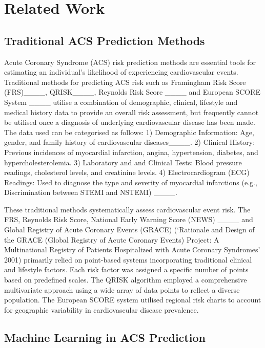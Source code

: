 \section{Related Work}
\subsection{Traditional ACS Prediction Methods}

Acute Coronary Syndrome (ACS) risk prediction methods are essential tools for estimating an individual's likelihood of experiencing cardiovascular events. Traditional methods for predicting ACS risk such as Framingham Risk Score (FRS)____, QRISK____, Reynolds Risk Score ____ and European SCORE System ____ utilise a combination of demographic, clinical, lifestyle and medical history data to provide an overall risk assessment, but frequently cannot be utilised once a diagnosis of underlying cardiovascular disease has been made. The data used can be categorised as follows: 1) Demographic Information: Age, gender, and family history of cardiovascular diseases____. 2) Clinical History: Previous incidences of myocardial infarction, angina, hypertension, diabetes, and hypercholesterolemia. 3) Laboratory and and Clinical Tests: Blood pressure readings, cholesterol levels, and creatinine levels. 4) Electrocardiogram (ECG) Readings: Used to diagnose the type and severity of myocardial infarctions (e.g., Discrimination between STEMI and NSTEMI) ____.

These traditional methods systematically assess cardiovascular event risk. The FRS, Reynolds Risk Score, National Early Warning Score (NEWS) ____  and Global Registry of Acute Coronary Events (GRACE) (‘Rationale and Design of the GRACE (Global Registry of Acute Coronary Events) Project: A Multinational Registry of Patients Hospitalized with Acute Coronary Syndromes’ 2001) primarily relied on point-based systems incorporating traditional clinical and lifestyle factors. Each risk factor was assigned a specific number of points based on predefined scales. The QRISK algorithm employed a comprehensive multivariate approach using a wide array of data points to reflect a diverse population. The European SCORE system utilised regional risk charts to account for geographic variability in cardiovascular disease prevalence. 

\subsection{Machine Learning in ACS Prediction}

